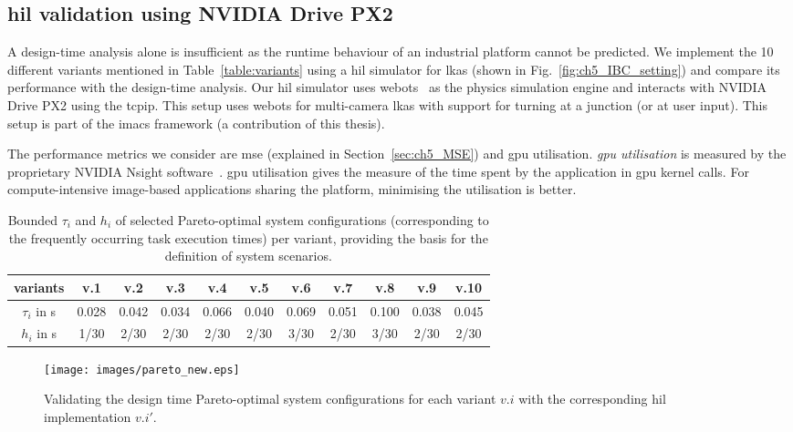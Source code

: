 \subsection{\Acrlong{hil} validation using NVIDIA Drive PX2}
\label{sec:ch5_HiL}
A design-time analysis alone is insufficient as the runtime behaviour of an industrial platform cannot be predicted.
We implement the 10 different variants mentioned in Table~\ref{table:variants} using a \gls{hil} simulator for \gls{lkas} (shown in Fig.~\ref{fig:ch5_IBC_setting}) and compare its performance with the design-time analysis. 
Our \gls{hil} simulator uses webots~\cite{michel2004cyberbotics} as the physics simulation engine and interacts with NVIDIA Drive PX2 using the \gls{tcpip}. This setup uses webots for multi-camera \gls{lkas} with support for turning at a junction (or at user input).
This setup is part of the \gls{imacs} framework (a contribution of this thesis).

The performance metrics we consider are \gls{mse} (explained in Section~\ref{sec:ch5_MSE}) and \gls{gpu} utilisation.
\textit{\gls{gpu} utilisation} is measured by the proprietary NVIDIA Nsight software~\cite{nsight20133}. \gls{gpu} utilisation  gives the measure of the time spent by the application in \gls{gpu} kernel calls. For compute-intensive image-based applications sharing the platform, minimising the utilisation is better.

\begin{table}
\scriptsize
\caption{Bounded $\tau_i$ and $h_i$ of  selected Pareto-optimal system configurations (corresponding to the frequently occurring task execution times) per variant, providing the basis for the definition of system scenarios.}
\label{table:tau_h}
\vspace{-1em}
\centering
\begin{tabular}{|c|c|c|c|c|c|c|c|c|c|c|}
\hline
variants               & v.1  & v.2  & v.3  & v.4  & v.5  & v.6  & v.7  & v.8  & v.9  & v.10 \\ \hline
$\tau_i$ in s & 0.028 & 0.042 & 0.034 & 0.066 & 0.040 & 0.069 & 0.051 & 0.100 & 0.038 & 0.045 \\ \hline
$h_i$ in s                  & 1/30 & 2/30 & 2/30 & 2/30 & 2/30 & 3/30 & 2/30 & 3/30 & 2/30 & 2/30 \\ \hline
\end{tabular}
\vspace{-1em}
\end{table}

\begin{figure}[tb]
    \centering
    \texttt{[image: images/pareto\_new.eps]}
    \vspace{-1.5em}
    \caption{Validating the design time Pareto-optimal system configurations for each variant $v.i$ with the corresponding \gls{hil} implementation $v.i'$.}
    \label{fig:ch5_Pareto}
\end{figure}


